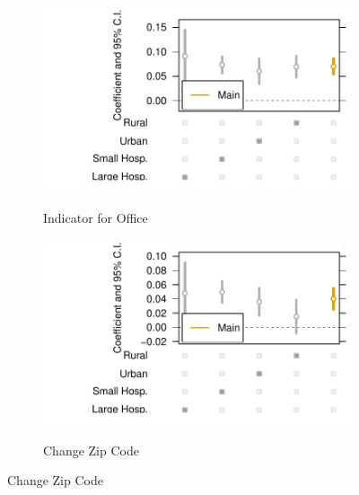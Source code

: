 \documentclass[12pt]{article}
\begin{document}
\begin{figure}[t!]
\medskip
\begin{subfigure}{0.48\textwidth}
\caption{Indicator for Office }
\includegraphics[width=\linewidth]{Objects/office_ind_heterog.pdf}
 \label{fig:c}
\end{subfigure}\hspace*{\fill}
\begin{subfigure}{0.48\textwidth}
\caption{Change Zip Code} 
\includegraphics[width=\linewidth]{Objects/change_zip_heterog.pdf}
\label{fig:d}
\end{subfigure}


\end{figure}
\end{document}
